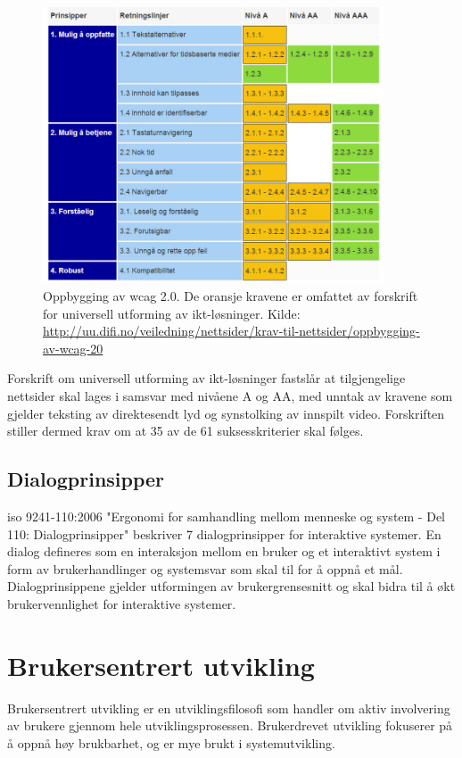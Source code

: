 \begin{figure}[H]
    \centering
    \includegraphics[width=0.9\textwidth]{fig/bakgrunn/wcag_tabell.jpg}
    \caption{Oppbygging av \acrshort{wcag} 2.0. De oransje kravene er omfattet av forskrift for universell utforming av \acrshort{ikt}-løsninger. Kilde: \url{http://uu.difi.no/veiledning/nettsider/krav-til-nettsider/oppbygging-av-wcag-20} }
    \label{fig:wcag_tabell}
\end{figure}

Forskrift om universell utforming av \acrshort{ikt}-løsninger fastslår at tilgjengelige nettsider skal lages i samsvar med nivåene A og AA, med unntak av kravene som gjelder teksting av direktesendt lyd og synstolking av innspilt video. Forskriften stiller dermed krav om at 35 av de 61 suksesskriterier skal følges.

\subsection{Dialogprinsipper}
\acrshort{iso} 9241-110:2006 "Ergonomi for samhandling mellom menneske og system - Del 110: Dialogprinsipper" beskriver 7 dialogprinsipper for interaktive systemer. En dialog defineres som en interaksjon mellom en bruker og et interaktivt system i form av brukerhandlinger og systemsvar som skal til for å oppnå et mål. Dialogprinsippene gjelder utformingen av brukergrensesnitt og skal bidra til å økt brukervennlighet for interaktive systemer. 


\section{Brukersentrert utvikling} \label{sec:brukersentrert}
Brukersentrert utvikling er en utviklingsfilosofi som handler om aktiv involvering av brukere gjennom hele utviklingsprosessen. Brukerdrevet utvikling fokuserer på å oppnå høy brukbarhet, og er mye brukt i systemutvikling. 

